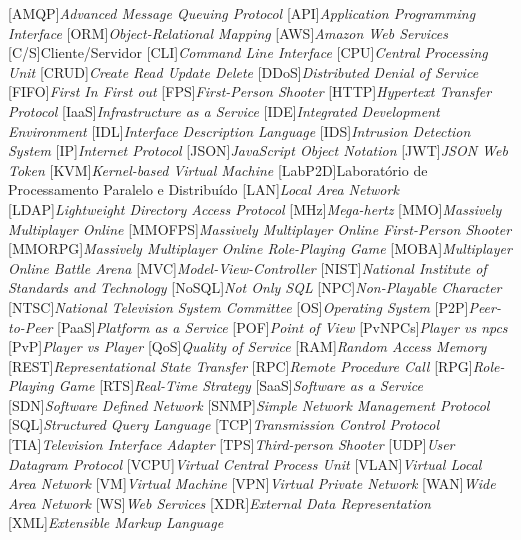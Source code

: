 \begin{acronym}[]
	[AMQP]{{\it Advanced Message Queuing Protocol}}
	[API]{{\it Application Programming Interface}}
	[ORM]{{\it Object-Relational Mapping}}
  	[AWS]{{\it Amazon Web Services}}
	[C/S]{{Cliente/Servidor}}
	[CLI]{{\it Command Line Interface}}
	[CPU]{{\it Central Processing Unit}}
	[CRUD]{{\it Create Read Update Delete}}
	[DDoS]{{\it Distributed Denial of Service}}
	[FIFO]{{\it First In First out}}
	[FPS]{{\it First-Person Shooter}}
	[HTTP]{{\it Hypertext Transfer Protocol}}
	[IaaS]{{\it Infrastructure as a Service}}
	[IDE]{{\it Integrated Development Environment}}
	[IDL]{{\it Interface Description Language}}
	[IDS]{{\it Intrusion Detection System}}
	[IP]{{\it Internet Protocol}}  
	[JSON]{{\it JavaScript Object Notation}}
	[JWT]{{\it JSON Web Token}}
	[KVM]{{\it Kernel-based Virtual Machine}}
	[LabP2D]{{Laboratório de Processamento Paralelo e Distribuído}}
	[LAN]{{\it Local Area Network}}
  	[LDAP]{{\it Lightweight Directory Access Protocol}}
	[MHz]{{\it Mega-hertz}}
	[MMO]{{\it Massively Multiplayer Online}}
	[MMOFPS]{{\it Massively Multiplayer Online First-Person Shooter}}
	[MMORPG]{{\it Massively Multiplayer Online Role-Playing Game}}
	[MOBA]{{\it Multiplayer Online Battle Arena}}
	[MVC]{{\it Model-View-Controller}}
	[NIST]{{\it National Institute of Standards and Technology}}
	[NoSQL]{{\it Not Only SQL}}
	[NPC]{{\it Non-Playable Character}}
	[NTSC]{{\it National Television System Committee}}
	[OS]{{\it Operating System}}
	[P2P]{{\it Peer-to-Peer}}
	[PaaS]{{\it Platform as a Service}}
	[POF]{{\it Point of View}}
	[PvNPCs]{{\it Player vs \acp{npc}}}
	[PvP]{{\it Player vs Player}}
	[QoS]{{\it Quality of Service}}
	[RAM]{{\it Random Access Memory}}
	[REST]{{\it Representational State Transfer}}
	[RPC]{{\it Remote Procedure Call}}
	[RPG]{{\it Role-Playing Game}}
	[RTS]{{\it Real-Time Strategy}}
	[SaaS]{{\it Software as a Service}}
	[SDN]{{\it Software Defined Network}}
	[SNMP]{{\it Simple Network Management Protocol}}
	[SQL]{{\it Structured Query Language}}
	[TCP]{{\it Transmission Control Protocol}}
	[TIA]{{\it Television Interface Adapter}}
	[TPS]{{\it Third-person Shooter}}
	[UDP]{{\it User Datagram Protocol}}
	[VCPU]{{\it Virtual Central Process Unit}}
	[VLAN]{{\it Virtual Local Area Network}}
	[VM]{{\it Virtual Machine}}
	[VPN]{{\it Virtual Private Network}}
	[WAN]{{\it Wide Area Network}}
	[WS]{{\it Web Services}}
	[XDR]{{\it External Data Representation}}
	[XML]{{\it Extensible Markup Language}}




\end{acronym}
